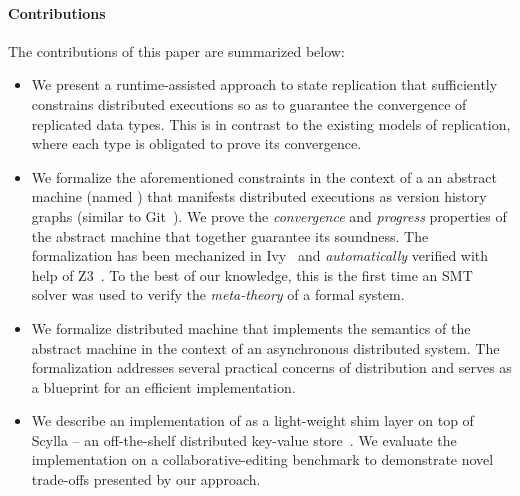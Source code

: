 
\paragraph{Contributions} The contributions of this paper are summarized
below:
\begin{itemize}
  \item We present a runtime-assisted approach to state replication
    that sufficiently constrains distributed executions so as to
    guarantee the convergence of replicated data types. This is in
    contrast to the existing models of replication, where each type is
    obligated to prove its convergence.

  \item We formalize the aforementioned constraints in the context of
    a an abstract machine (named \quark) that manifests distributed
    executions as version history graphs (similar to Git~\cite{git}).
    We prove the \emph{convergence} and \emph{progress} properties of
    the \quark abstract machine that together guarantee its soundness.
    The formalization has been mechanized in Ivy~\cite{ivy} and
    \emph{automatically} verified with help of Z3~\cite{z3}. To the
    best of our knowledge, this is the first time an SMT solver was
    used to verify the \emph{meta-theory} of a formal system.

  \item We formalize \quark distributed machine that implements the
    semantics of the \quark abstract machine in the context of an
    asynchronous distributed system. The formalization addresses
    several practical concerns of distribution and serves as a
    blueprint for an efficient implementation.

  \item We describe an implementation of \quark as a light-weight shim
    layer on top of Scylla -- an off-the-shelf distributed key-value
    store~\cite{scylla}. We evaluate the implementation on a
    collaborative-editing benchmark to demonstrate novel trade-offs
    presented by our approach.
\end{itemize}


